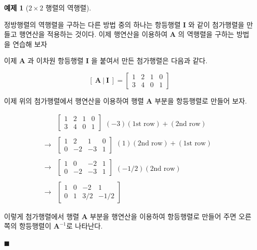 \documentclass[
  11pt,
  a4paper,
  oneside]{scrbook}
\theoremstyle{definition}
\theoremstyle{definition}
\newtheorem{exercise}{예제}[chapter]
\theoremstyle{plain}
\theoremstyle{remark}
\begin{document}
\begin{exercise}[\(2 \times 2\) 행렬의
역행렬]\protect\hypertarget{exr-inverse1}{}\label{exr-inverse1}

정방행렬의 역행렬을 구하는 다른 방법 중의 하나는 항등행렬 \(\pmb I\) 와
같이 첨가행렬을 만들고 행연산을 적용하는 것이다. 이제 행연산을 이용하여
\(\pmb A\) 의 역행렬을 구하는 방법을 연습해 보자

이제 \(\pmb A\) 과 이차원 항등행렬 \(\pmb I\) 을 붙여서 만든 첨가행렬은
다음과 같다.

\[
[ ~\pmb A ~|~ \pmb I ~]=
\left[\begin{array}{cc|cc}
1 & 2 & 1 & 0\\
3 & 4  & 0 & 1
\end{array}\right]
\]

이제 위의 첨가행렬에서 행연산을 이용하여 행렬 \(\pmb A\) 부분을
항등행렬로 만들어 보자.

\[
\begin{aligned}
& 
\left[\begin{array}{cc|cc}
1 & 2 &  1 & 0\\
3 & 4 & 0 & 1 
\end{array}\right]  
\begin{array}{c}
 \\
 (-3)(\text{1st row}) + (\text{2nd row}) 
\end{array} \\
& \\
 \rightarrow &
\left[\begin{array}{cc|cc}
1 & 2  & 1 & 0\\
0 & -2 & -3 & 1 
\end{array}\right]  
\begin{array}{c}
(1)(\text{2nd row}) + (\text{1st row}) 
\\
\end{array} \\
& \\
 \rightarrow &
\left[\begin{array}{cc|cc}
1 & 0  & -2 & 1\\
0 & -2 & -3 & 1 
\end{array}\right]  
\begin{array}{c}
\\
(-1/2) (\text{2nd row}) 
\end{array} \\
& \\
 \rightarrow & 
\left[\begin{array}{cc|cc}
1 & 0  & -2 & 1\\
0 & 1 & 3/2 &-1/2 
\end{array}\right] 
\end{aligned}
\]

이렇게 첨가행렬에서 행렬 \(\pmb A\) 부분을 행연산을 이용하여 항등행렬로
만들어 주면 오른쪽의 항등행렬이 \(\pmb A^{-1}\)로 나타난다.

\(\blacksquare\)

\end{exercise}
\end{document}
